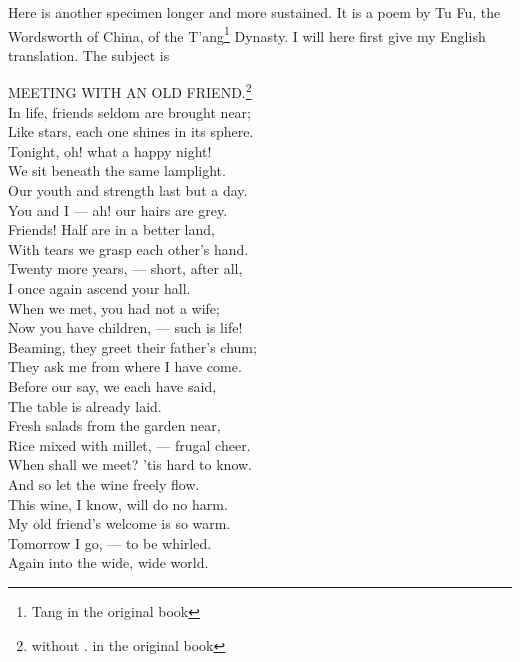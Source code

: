 Here is another specimen longer and more sustained.
It is a poem by Tu Fu, the Wordsworth of China, of the T'ang\footnote{Tang in the original book} Dynasty.
I will here first give my English translation.
The subject is
\begin{center}
    MEETING WITH AN OLD FRIEND.\footnote{without . in the original book} \\
   In life, friends seldom are brought near; \\
   Like stars, each one shines in its sphere. \\
   Tonight, oh! what a happy night! \\
   We sit beneath the same lamplight. \\
   Our youth and strength last but a day. \\
   You and I --- ah! our hairs are grey. \\
   Friends! Half are in a better land, \\
   With tears we grasp each other's hand. \\
   Twenty more years, --- short, after all, \\
   I once again ascend your hall. \\
   When we met, you had not a wife; \\
   Now you have children, --- such is life! \\
   Beaming, they greet their father's chum; \\
   They ask me from where I have come. \\
   Before our say, we each have said, \\
   The table is already laid. \\
   Fresh salads from the garden near, \\
   Rice mixed with millet, --- frugal cheer. \\
   When shall we meet? 'tis hard to know. \\
   And so let the wine freely flow. \\
   This wine, I know, will do no harm. \\
   My old friend's welcome is so warm. \\
   Tomorrow I go, --- to be whirled. \\
   Again into the wide, wide world.
\end{center}


